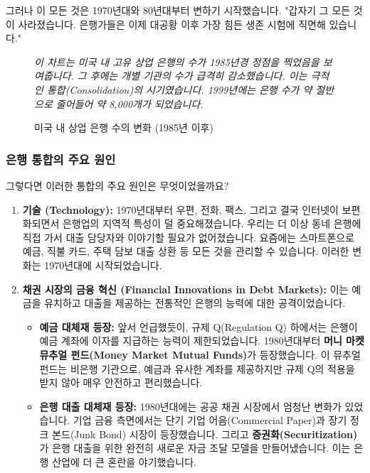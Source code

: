 \documentclass[11pt,a4paper]{article}
\theoremstyle{definition}
\begin{document}
그러나 이 모든 것은 1970년대와 80년대부터 변하기 시작했습니다. "갑자기 그 모든 것이 사라졌습니다. 은행가들은 이제 대공황 이후 가장 힘든 생존 시험에 직면해 있습니다."

\begin{figure}[h!]
    \centering
    \caption{미국 내 상업 은행 수의 변화 (1985년 이후)}
    \label{fig:commercial_banks_peak}
    \textit{이 차트는 미국 내 고유 상업 은행의 수가 1985년경 정점을 찍었음을 보여줍니다. 그 후에는 개별 기관의 수가 급격히 감소했습니다. 이는 극적인 통합(Consolidation)의 시기였습니다. 1999년에는 은행 수가 약 절반으로 줄어들어 약 8,000개가 되었습니다.}
\end{figure}

\subsubsection*{은행 통합의 주요 원인}
그렇다면 이러한 통합의 주요 원인은 무엇이었을까요?

\begin{enumerate}
    \item \textbf{기술 (Technology):}
    1970년대부터 우편, 전화, 팩스, 그리고 결국 인터넷이 보편화되면서 은행업의 지역적 특성이 덜 중요해졌습니다. 우리는 더 이상 동네 은행에 직접 가서 대출 담당자와 이야기할 필요가 없어졌습니다. 요즘에는 스마트폰으로 예금, 직불 카드, 주택 담보 대출 상환 등 모든 것을 관리할 수 있습니다. 이러한 변화는 1970년대에 시작되었습니다.

    \item \textbf{채권 시장의 금융 혁신 (Financial Innovations in Debt Markets):}
    이는 예금을 유치하고 대출을 제공하는 전통적인 은행의 능력에 대한 공격이었습니다.
    \begin{itemize}
        \item \textbf{예금 대체재 등장:} 앞서 언급했듯이, 규제 Q(Regulation Q) 하에서는 은행이 예금 계좌에 이자를 지급하는 능력이 제한되었습니다. 1980년대부터 \textbf{머니 마켓 뮤추얼 펀드(Money Market Mutual Funds)}가 등장했습니다. 이 뮤추얼 펀드는 비은행 기관으로, 예금과 유사한 계좌를 제공하지만 규제 Q의 적용을 받지 않아 매우 안전하고 편리했습니다.
        \item \textbf{은행 대출 대체재 등장:} 1980년대에는 공공 채권 시장에서 엄청난 변화가 있었습니다. 기업 금융 측면에서는 단기 기업 어음(Commercial Paper)과 장기 정크 본드(Junk Bond) 시장이 등장했습니다. 그리고 \textbf{증권화(Securitization)}가 은행 대출을 위한 완전히 새로운 자금 조달 모델을 만들어냈습니다. 이는 은행 산업에 더 큰 혼란을 야기했습니다.
    \end{itemize}
\end{enumerate}
\end{document}
